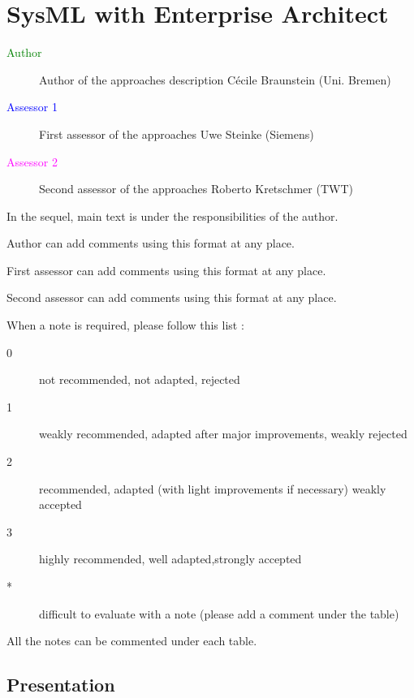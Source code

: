 \chapter{SysML with Enterprise Architect}

\begin{description}
\item[\textcolor{green}{Author}] Author of the approaches description  Cécile Braunstein (Uni. Bremen)
\item[\textcolor{blue}{Assessor 1}] First assessor of the approaches Uwe Steinke (Siemens)
\item[\textcolor{magenta}{Assessor 2}] Second assessor of the approaches Roberto Kretschmer (TWT)
\end{description}

In the sequel, main text is under the responsibilities of the author.

\begin{author_comment}
Author can add comments using this format at any place.
\end{author_comment}

\begin{assessor1}
First assessor can add comments using this format at any place.
\end{assessor1}

\begin{assessor2}
Second assessor can add comments using this format at any place.
\end{assessor2}

When a note is required, please follow this list :
\begin{description}
\item[0] not recommended, not adapted, rejected
\item[1] weakly recommended, adapted after major improvements, weakly rejected
\item[2] recommended, adapted (with light improvements if necessary)  weakly accepted
\item[3] highly recommended, well adapted,strongly accepted
\item[*] difficult to evaluate with a note (please add a comment under the table)
\end{description}

All the notes can be commented under each table.

\section{Presentation}

